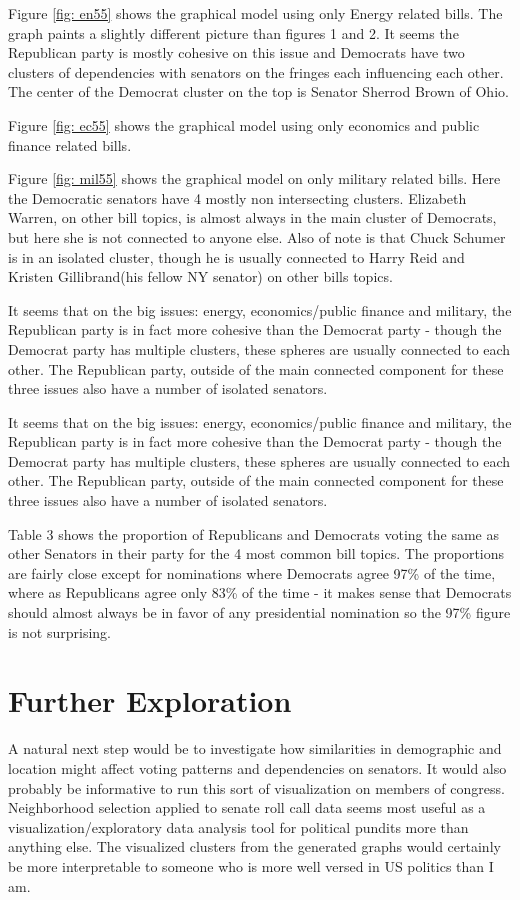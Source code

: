 \documentclass{article}
\begin{document}
Figure \ref{fig: en55} shows the graphical model using only Energy related bills. The graph paints a slightly different picture than figures 1 and 2. It seems the Republican party is mostly cohesive on this issue
and Democrats have two clusters of dependencies with senators on the fringes each influencing each other. The center of the Democrat cluster on the top is Senator Sherrod Brown of Ohio.

Figure \ref{fig: ec55} shows the graphical model using only economics and public finance related bills.

Figure \ref{fig: mil55} shows the graphical model on only military related bills. Here the Democratic senators have 4 mostly non intersecting clusters. Elizabeth Warren, on other bill topics, is almost always in
the main cluster of Democrats, but here she is not connected to anyone else. Also of note is that Chuck Schumer is in an isolated cluster, though he is usually connected to Harry Reid and Kristen Gillibrand(his fellow NY senator) on other bills topics.

It seems that on the big issues: energy, economics/public finance and military, the Republican party is in fact more cohesive than the Democrat party - though the Democrat party has multiple clusters, these spheres are usually connected to each other. The Republican party, outside of the main connected component for these three issues also have a number of isolated senators.

It seems that on the big issues: energy, economics/public finance and military, the Republican party is in fact more cohesive than the Democrat party - though the Democrat party has multiple clusters, these spheres are usually connected to each other. The Republican party, outside of the main connected component for these three issues also have a number of isolated senators.

Table 3 shows the proportion of Republicans and Democrats voting the same as other Senators in their party for the 4 most common bill topics. The proportions are fairly close except for nominations where Democrats agree 97\% of the time, where as Republicans agree only 83\% of the time - it makes sense that Democrats should almost always be in favor of any presidential nomination so the 97\% figure is not surprising.

\section{Further Exploration}
A natural next step would be to investigate how similarities in demographic and location might affect voting patterns and dependencies on senators. It would also probably be
informative to run this sort of visualization on members of congress. Neighborhood selection applied to senate roll call data seems most useful as a visualization/exploratory
data analysis tool for political pundits more than anything else. The visualized clusters from the generated graphs would certainly be more interpretable to someone who is more well versed in US politics than I am.
\end{document}
